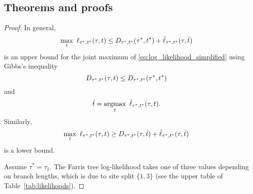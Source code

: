 \subsection*{Theorems and proofs}

\topoInconsist*

\begin{proof}
In general,
$$
\max_{t} \ \ell_{\tau^*,t^*}(\tau, t) \le
    \shannonDivergence_{\tau^*,t^*}(\tau^*,t^*)
    + \tilde{\ell}_{\tau^*,t^*}(\tau, \hat{t})
$$
is an upper bound for the joint maximum of \eqref{eq:log_likelihood_simplified} using Gibbs's inequality
$$
D_{\tau^*,t^*}(\tau,t) \le D_{\tau^*,t^*}(\tau^*,t^*)
$$
and
$$
\hat{t} = \argmax_{t} \ \tilde{\ell}_{\tau^*,t^*}(\tau, t).
$$
Similarly,
$$
\max_{t} \ \ell_{\tau^*,t^*}(\tau, t) \ge
    D_{\tau^*,t^*}(\tau,\hat{t})
    + \tilde{\ell}_{\tau^*,t^*}(\tau, \hat{t})
$$
is a lower bound.

Assume $\tau^*=\tau_1$.
The Farris tree log-likelihood takes one of three values depending on branch lengths, which is due to site split $\{1,3\}$ (see the upper table of Table~\ref{tab:likelihoods}).


\end{proof}
